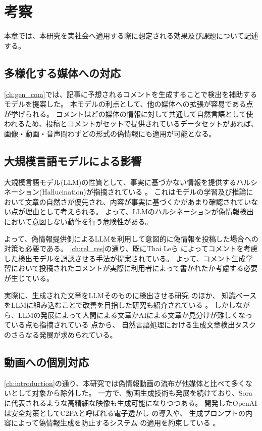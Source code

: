 \chapter{考察}
\label{ch:discussion}
本章では、本研究を実社会へ適用する際に想定される効果及び課題について記述する。

\section{多様化する媒体への対応}
\cref{ch:gen_com}では、記事に予想されるコメントを生成することで検出を補助するモデルを提案した。
本モデルの利点として、他の媒体への拡張が容易である点が挙げられる。
コメントはどの媒体の情報に対して共通して自然言語として使われるため、投稿とコメントがセットで提供されているデータセットがあれば、画像・動画・音声問わずどの形式の偽情報にも適用が可能となる。

\section{大規模言語モデルによる影響}
大規模言語モデル(LLM)の性質として、事実に基づかない情報を提供するハルシネーション(Hallucination)が指摘されている \cite{Alkaissi2023-bo}。
これはモデルの学習及び推論において文章の自然さが優先され、内容が事実に基づくかがあまり確認されていない点が理由として考えられる。
よって、LLMのハルシネーションが偽情報検出において意図しない動作を行う危険性がある。

よって、偽情報提供側によるLLMを利用して意図的に偽情報を投稿した場合への対策も必要である。
\cref{ch:rel_res}の通り、既にThai Leら \cite{9338282}によってコメントを考慮した検出モデルを誤認させる手法が提案されている。
よって、コメント生成学習において投稿されたコメントが実際に利用者によって書かれたか考慮する必要が生じている。

実際に、生成された文章をLLMそのものに検出させる研究 \cite{10.1145/3655103.3655106} のほか、
知識ベースをLLMに組み込むことで改善を目指した研究も紹介されている \cite{10.1145/3512467}。
しかしながら、LLMの発展によって人間による文章かAIによる文章か見分けが難しくなっている点も指摘されている \cite{Elkhatat2023,chen2023can}点から、
自然言語処理における生成文章検出タスクのさらなる発展が求められている。


\section{動画への個別対応}
\cref{ch:introduction}の通り、本研究では偽情報動画の流布が他媒体と比べて多くないとして対象から除外した。
一方で、動画生成技術も発展を続けており、Sora \cite{videoworldsimulators2024}に代表されるような高精細な映像も生成可能になりつつある。
開発したOpenAIは安全対策としてC2PAと呼ばれる電子透かし \cite{C2PA}の導入や、
生成プロンプトの内容によって偽情報生成を防止するシステム \cite{AI_2023}の適用を約束している \cite{AI_2024}。

